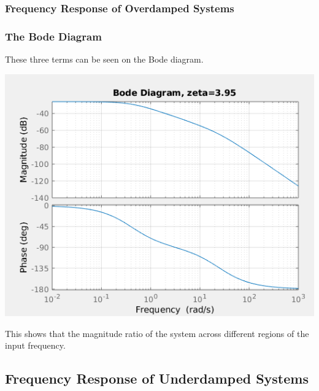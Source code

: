 \documentclass[fleqn]{beamer} %
\newcommand{\sectionIIIsubsectionIItitle}{Frequency Response of Overdamped Systems}
\newcommand{\sectionIIIsubsectionIIItitle}{Frequency Response of Underdamped Systems}
\begin{document}
			\begin{frame}
				\frametitle{\sectionIIIsubsectionIItitle}
				\bigskip

				\frametitle{The Bode Diagram}
				\small
				These three terms can be seen on the Bode diagram. \vspc
				\vspc

				\includegraphics[scale=.30]{images/lecture3_fig3.png}

				This shows that the magnitude ratio of the system across different regions of the input frequency. 

				\btVFill
			\end{frame}

		\subsection{\sectionIIIsubsectionIIItitle}\label{sectionIIIsubsectionIII}
\end{document}
